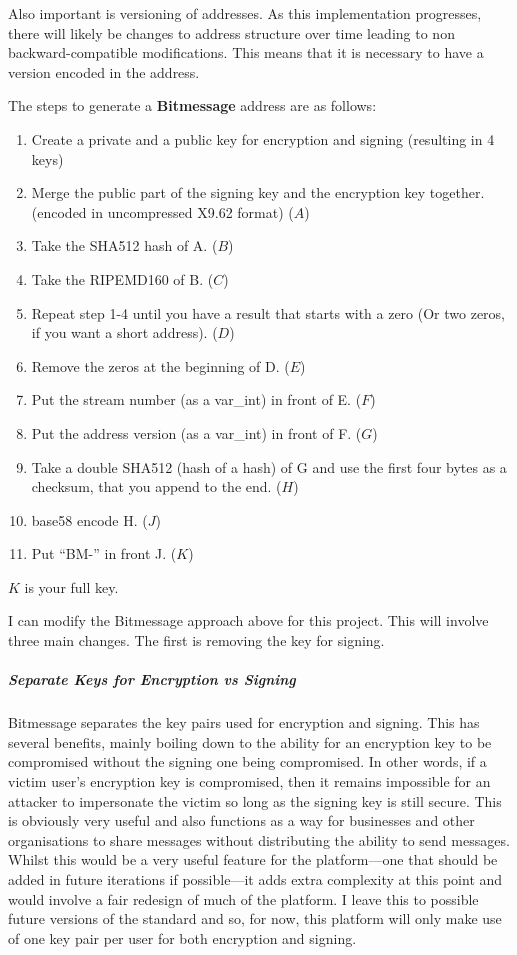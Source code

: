 \documentclass{article}
\begin{document}
Also important is versioning of addresses. As this implementation progresses, there will likely be changes to address structure over time leading to non backward-compatible modifications. This means that it is necessary to have a version encoded in the address.

The steps to generate a \textbf{Bitmessage} address are as follows\cite{bitmessage_address}:
\begin{enumerate}
    \item Create a private and a public key for encryption and signing (resulting in 4 keys)
    \item Merge the public part of the signing key and the encryption key together. (encoded in uncompressed X9.62 format) ($A$)
    \item Take the SHA512 hash of A. ($B$)
    \item Take the RIPEMD160 of B. ($C$)
    \item Repeat step 1-4 until you have a result that starts with a zero (Or two zeros, if you want a short address). ($D$)
    \item Remove the zeros at the beginning of D. ($E$)
    \item Put the stream number (as a var\_int) in front of E. ($F$)
    \item Put the address version (as a var\_int) in front of F. ($G$)
    \item Take a double SHA512 (hash of a hash) of G and use the first four bytes as a checksum, that you append to the end. ($H$)
    \item base58 encode H. ($J$)
    \item Put ``BM-'' in front J. ($K$)
\end{enumerate}
$K$ is your full key.

I can modify the Bitmessage approach above for this project. This will involve three main changes. The first is removing the key for signing.

\subparagraph{Separate Keys for Encryption vs Signing}
Bitmessage separates the key pairs used for encryption and signing. This has several benefits, mainly boiling down to the ability for an encryption key to be compromised without the signing one being compromised. In other words, if a victim user's encryption key is compromised, then it remains impossible for an attacker to impersonate the victim so long as the signing key is still secure. This is obviously very useful and also functions as a way for businesses and other organisations to share messages without distributing the ability to send messages. Whilst this would be a very useful feature for the platform---one that should be added in future iterations if possible---it adds extra complexity at this point and would involve a fair redesign of much of the platform. I leave this to possible future versions of the standard and so, for now, this platform will only make use of one key pair per user for both encryption and signing.
\end{document}
